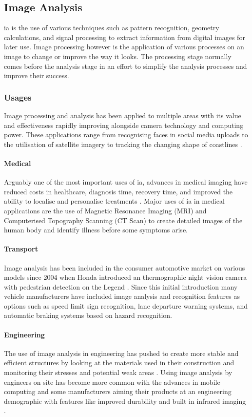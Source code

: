 \subsection{Image Analysis}
	\gls{ia} is the use of various techniques such as pattern recognition, geometry calculations, and signal processing to extract information from digital images for later use. Image processing however is the application of various processes on an image to change or improve the way it looks. The processing stage normally comes before the analysis stage in an effort to simplify the analysis processes and improve their success.
	\subsubsection{Usages}
	Image processing and analysis has been applied to multiple areas with its value and effectiveness rapidly improving alongside camera technology and computing power. These applications range from recognising faces in social media uploads \citep{zuckerberg2011tagging} to the utilisation of satellite imagery to tracking the changing shape of coastlines \citep{costalimagery}.
	\paragraph{Medical}
	Arguably one of the most important uses of \gls{ia}, advances in medical imaging have reduced costs in healthcare, diagnosis time, recovery time, and improved the ability to localise and personalise treatments \citep{esfmedical}. Major uses of \gls{ia} in medical applications are the use of Magnetic Resonance Imaging (MRI) and Computerised Topography Scanning (CT Scan) to create detailed images of the human body and identify illness before some symptoms arise.
	\paragraph{Transport}
	Image analysis has been included in the consumer automotive market on various models since 2004 when Honda introduced an thermographic night vision camera with pedestrian detection on the Legend  \citep{hondanightvision}. Since this initial introduction many vehicle manufacturers have included image analysis and recognition features as options such as speed limit sign recognition, lane departure warning systems, and automatic braking systems based on hazard recognition.
	\paragraph{Engineering}
	The use of image analysis in engineering has pushed to create more stable and efficient structures by looking at the materials used in their construction \citep{concreteanalysis} and monitoring their stresses and potential weak areas \citep{bridgecables}. Using image analysis by engineers on site has become more common with the advances in mobile computing and some manufacturers aiming their products at an engineering demographic with features like improved durability and built in infrared imaging \citep{catphone}.
